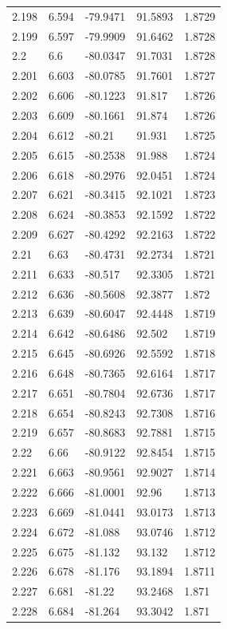 \begin{tabular}{lllll}
2.198 & 6.594 & -79.9471 & 91.5893 & 1.8729 \\
2.199 & 6.597 & -79.9909 & 91.6462 & 1.8728 \\
2.2 & 6.6 & -80.0347 & 91.7031 & 1.8728 \\
2.201 & 6.603 & -80.0785 & 91.7601 & 1.8727 \\
2.202 & 6.606 & -80.1223 & 91.817 & 1.8726 \\
2.203 & 6.609 & -80.1661 & 91.874 & 1.8726 \\
2.204 & 6.612 & -80.21 & 91.931 & 1.8725 \\
2.205 & 6.615 & -80.2538 & 91.988 & 1.8724 \\
2.206 & 6.618 & -80.2976 & 92.0451 & 1.8724 \\
2.207 & 6.621 & -80.3415 & 92.1021 & 1.8723 \\
2.208 & 6.624 & -80.3853 & 92.1592 & 1.8722 \\
2.209 & 6.627 & -80.4292 & 92.2163 & 1.8722 \\
2.21 & 6.63 & -80.4731 & 92.2734 & 1.8721 \\
2.211 & 6.633 & -80.517 & 92.3305 & 1.8721 \\
2.212 & 6.636 & -80.5608 & 92.3877 & 1.872 \\
2.213 & 6.639 & -80.6047 & 92.4448 & 1.8719 \\
2.214 & 6.642 & -80.6486 & 92.502 & 1.8719 \\
2.215 & 6.645 & -80.6926 & 92.5592 & 1.8718 \\
2.216 & 6.648 & -80.7365 & 92.6164 & 1.8717 \\
2.217 & 6.651 & -80.7804 & 92.6736 & 1.8717 \\
2.218 & 6.654 & -80.8243 & 92.7308 & 1.8716 \\
2.219 & 6.657 & -80.8683 & 92.7881 & 1.8715 \\
2.22 & 6.66 & -80.9122 & 92.8454 & 1.8715 \\
2.221 & 6.663 & -80.9561 & 92.9027 & 1.8714 \\
2.222 & 6.666 & -81.0001 & 92.96 & 1.8713 \\
2.223 & 6.669 & -81.0441 & 93.0173 & 1.8713 \\
2.224 & 6.672 & -81.088 & 93.0746 & 1.8712 \\
2.225 & 6.675 & -81.132 & 93.132 & 1.8712 \\
2.226 & 6.678 & -81.176 & 93.1894 & 1.8711 \\
2.227 & 6.681 & -81.22 & 93.2468 & 1.871 \\
2.228 & 6.684 & -81.264 & 93.3042 & 1.871 \\

\end{tabular}
